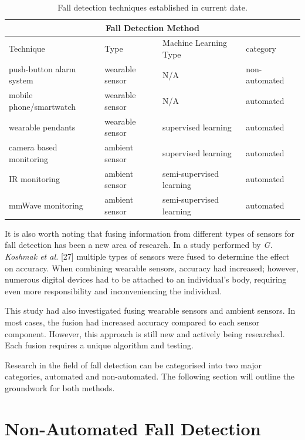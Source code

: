 \begin{table}[htp]
    \centering
    \begin{tabular}{ |p{3.5cm}|p{3.0cm}|p{2.5cm}|p{2.6cm}|}
     \hline
     \multicolumn{4}{|c|}{Fall Detection Method} \\
     \hline
     Technique& Type &Machine Learning Type&category\\
     \hline
     \hline
     push-button alarm system&wearable sensor&N/A&non-automated\\
     \hline
     mobile phone/smartwatch&wearable sensor&N/A&automated\\
     \hline
     wearable pendants&wearable sensor&supervised learning&automated\\
     \hline
     camera based monitoring&ambient sensor&supervised learning&automated\\
     \hline
     IR monitoring&ambient sensor&semi-supervised learning&automated\\
     \hline
     mmWave monitoring&ambient sensor&semi-supervised learning&automated\\
     \hline
    \end{tabular}
    \caption{Fall detection techniques established in current date.}
\end{table}

It is also worth noting that fusing information from different types of sensors for fall detection has been a new area of research. In a study performed by \textit{G. Koshmak et al.} [27] multiple types of sensors were fused to determine the effect on accuracy. When combining wearable sensors, accuracy had increased; however, numerous digital devices had to be attached to an individual's body, requiring even more responsibility and inconveniencing the individual. 

This study had also investigated fusing wearable sensors and ambient sensors. In most cases, the fusion had increased accuracy compared to each sensor component. However, this approach is still new and actively being researched. Each fusion requires a unique algorithm and testing. 

Research in the field of fall detection can be categorised into two major categories, automated and non-automated. The following section will outline the groundwork for both methods.

\section{Non-Automated Fall Detection}
